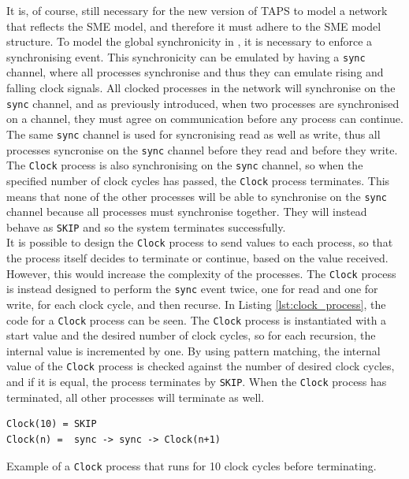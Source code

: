 It is, of course, still necessary for the new version of TAPS to model a \cspm{} network that reflects the SME model, and therefore it must adhere to the SME model structure. To model the global synchronicity in \cspm{}, it is necessary to enforce a synchronising event. This synchronicity can be emulated by having a \texttt{sync} channel, where all processes synchronise and thus they can emulate rising and falling clock signals. All clocked processes in the network will synchronise on the \texttt{sync} channel, and as previously introduced, when two processes are synchronised on a channel, they must agree on communication before any process can continue. The same \texttt{sync} channel is used for syncronising read as well as write, thus all processes syncronise on the \texttt{sync} channel before they read and before they write.
The \texttt{Clock} process is also synchronising on the \texttt{sync} channel, so when the specified number of clock cycles has passed, the \texttt{Clock} process terminates.
This means that none of the other processes will be able to synchronise on the \texttt{sync} channel because all processes must synchronise together. They will instead behave as \texttt{SKIP} and so the system terminates successfully.\\

It is possible to design the \texttt{Clock} process to send values to each process, so that the process itself decides to terminate or continue, based on the value received. However, this would increase the complexity of the processes. The \texttt{Clock} process is instead designed to perform the \texttt{sync} event twice, one for read and one for write, for each clock cycle, and then recurse. In Listing \ref{lst:clock_process}, the \cspm{} code for a \texttt{Clock} process can be seen. The \texttt{Clock} process is instantiated with a start value and the desired number of clock cycles, so for each recursion, the internal value is incremented by one. By using pattern matching, the internal value of the \texttt{Clock} process is checked against the number of desired clock cycles, and if it is equal, the process terminates by \texttt{SKIP}. When the \texttt{Clock} process has terminated, all other processes will terminate as well.
\begin{listing}
\begin{verbatim}
Clock(10) = SKIP
Clock(n) =  sync -> sync -> Clock(n+1)
\end{verbatim}
\caption{Example of a \texttt{Clock} process that runs for 10 clock cycles before terminating. }
\label{lst:clock_process}
\end{listing}
